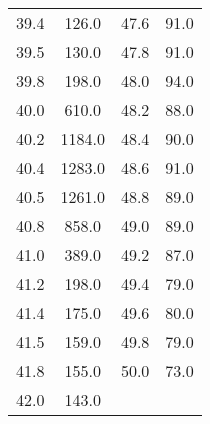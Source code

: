 \begin{table}[H]
\begin{tabular}{c c c c }
        39.4  & 	126.0   & 47.6  &	91.0  \\
        39.5  & 	130.0   & 47.8  &	91.0  \\
        39.8  & 	198.0   & 48.0  &	94.0  \\
        40.0  & 	610.0   & 48.2  &	88.0  \\
        40.2  & 	1184.0  & 48.4  &	90.0  \\
        40.4  & 	1283.0  & 48.6  &	91.0  \\
        40.5  & 	1261.0  & 48.8  &	89.0  \\
        40.8  & 	858.0   & 49.0  &	89.0  \\
        41.0  & 	389.0   & 49.2  &	87.0  \\
        41.2  & 	198.0   & 49.4  &	79.0  \\
        41.4  & 	175.0   & 49.6  &	80.0  \\
        41.5  & 	159.0   & 49.8  &	79.0  \\
        41.8  & 	155.0   & 50.0  &	73.0  \\
        42.0  & 	143.0   &       &          \\                                                        
        \bottomrule
    \end{tabular}
\end{table}

